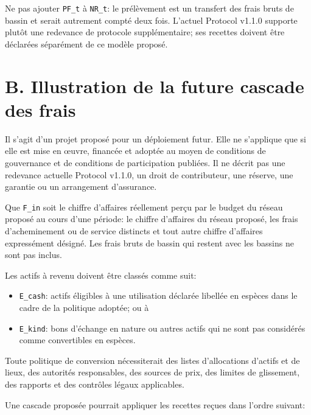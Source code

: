 \documentclass[11pt]{article}
\begin{document}
Ne pas ajouter \texttt{PF\_t} à \texttt{NR\_t}: le prélèvement est un transfert des frais bruts de bassin et serait autrement compté deux fois. L'actuel Protocol v1.1.0 supporte plutôt une redevance de protocole supplémentaire; ses recettes doivent être déclarées séparément de ce modèle proposé.


\section*{B. Illustration de la future cascade des frais}

Il s'agit d'un projet proposé pour un déploiement futur. Elle ne s'applique que si elle est mise en œuvre, financée et adoptée au moyen de conditions de gouvernance et de conditions de participation publiées. Il ne décrit pas une redevance actuelle Protocol v1.1.0, un droit de contributeur, une réserve, une garantie ou un arrangement d'assurance.

Que \texttt{F\_in} soit le chiffre d'affaires réellement perçu par le budget du réseau proposé au cours d'une période: le chiffre d'affaires du réseau proposé, les frais d'acheminement ou de service distincts et tout autre chiffre d'affaires expressément désigné. Les frais bruts de bassin qui restent avec les bassins ne sont pas inclus.

Les actifs à revenu doivent être classés comme suit:

\begin{itemize}[leftmargin=*]
\item \texttt{E\_cash}: actifs éligibles à une utilisation déclarée libellée en espèces dans le cadre de la politique adoptée; ou à
\item \texttt{E\_kind}: bons d'échange en nature ou autres actifs qui ne sont pas considérés comme convertibles en espèces.
\end{itemize}
Toute politique de conversion nécessiterait des listes d'allocations d'actifs et de lieux, des autorités responsables, des sources de prix, des limites de glissement, des rapports et des contrôles légaux applicables.

Une cascade proposée pourrait appliquer les recettes reçues dans l'ordre suivant:
\end{document}
